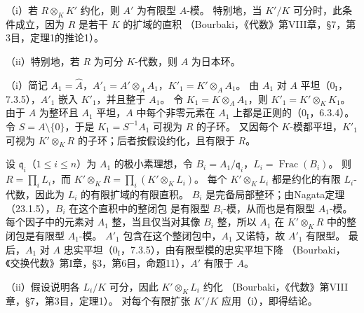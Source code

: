 \noindent（i）若 $R\otimes_KK'$ 约化，则 $A'$ 为有限型 $A$-模。
特别地，当 $K'/K$ 可分时，此条件成立，因为 $R$ 是若干 $K$ 的扩域的直积
（Bourbaki，《代数》第VIII章，\S7，第3目，定理1的推论1）。

\noindent（ii）特别地，若 $R$ 为可分 $K$-代数，则 $A$ 为日本环。

\eproof
（i）简记 $A_1=\widehat A$，$A'_1=A'\otimes_AA_1$，$K'_1=K'\otimes_AA_1$。
由 $A_1$ 对 $A$ 平坦（$0_{\mathrm I}$，7.3.5），$A'_1$ 嵌入 $K'_1$，并且整于 $A_1$。
令 $K_1=K\otimes_AA_1$，则 $K'_1=K'\otimes_KK_1$。
由于 $A$ 为整环且 $A_1$ 平坦，$A$ 中每个非零元素在 $A_1$ 上都是正则的（$0_{\mathrm I}$，6.3.4）。
令 $S=A\setminus\{0\}$，于是 $K_1=S^{-1}A_1$ 可视为 $R$ 的子环。
又因每个 $K$-模都平坦，$K'_1$ 可视为 $K'\otimes_KR$ 的子环；后者按假设约化，且有限于 $R$。

设 $\mathfrak q_i$（$1\le i\le n$）为 $A_1$ 的极小素理想，令
$B_i=A_1/\mathfrak q_i$，$L_i=\operatorname{Frac}(B_i)$。
则 $R=\prod_iL_i$，而 $K'\otimes_KR=\prod_i(K'\otimes_KL_i)$。
每个 $K'\otimes_KL_i$ 都是约化的有限 $L_i$-代数，因此为 $L_i$ 的有限扩域的有限直积。
$B_i$ 是完备局部整环；由Nagata定理（23.1.5），$B_i$ 在这个直积中的整闭包
是有限型 $B_i$-模，从而也是有限型 $A_1$-模。
每个因子中的元素对 $A_1$ 整，当且仅当对其像 $B_i$ 整，所以
$A_1$ 在 $K'\otimes_KR$ 中的整闭包是有限型 $A_1$-模。
$A'_1$ 包含在这个整闭包中，$A_1$ 又诺特，故 $A'_1$ 有限型。
最后，$A_1$ 对 $A$ 忠实平坦（$0_{\mathrm I}$，7.3.5），由有限型模的忠实平坦下降
（Bourbaki，《交换代数》第I章，\S3，第6目，命题11），$A'$ 有限于 $A$。

（ii）假设说明各 $L_i/K$ 可分，因此 $K'\otimes_KL_i$ 约化
（Bourbaki，《代数》第VIII章，\S7，第3目，定理1）。
对每个有限扩张 $K'/K$ 应用（i），即得结论。
\finishproof
